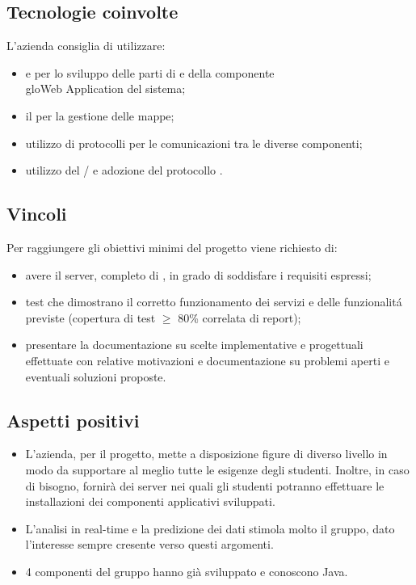 \subsection{Tecnologie coinvolte}
L'azienda consiglia di utilizzare:
\begin{itemize}
	\item {} e  per lo sviluppo delle parti di  e  della componente \\glo{Web Application} del sistema;
	\item il   per la gestione delle mappe;
	\item utilizzo di protocolli  per le comunicazioni tra le diverse componenti;
	\item utilizzo del  / e adozione del protocollo . 
\end{itemize}

\subsection{Vincoli}
Per raggiungere gli obiettivi minimi del progetto viene richiesto di:
\begin{itemize}
	\item avere il server, completo di , in grado di soddisfare i requisiti espressi;
	\item test che dimostrano il corretto funzionamento dei servizi e delle funzionalit\'a previste (copertura di test $\geq$ 80\% correlata di report);
	\item presentare la documentazione su scelte implementative e progettuali effettuate con relative motivazioni e documentazione su problemi aperti e eventuali soluzioni proposte.
\end{itemize}

\subsection{Aspetti positivi}
\begin{itemize}
	\item L'azienda, per il progetto, mette a disposizione figure di diverso livello in modo da supportare al meglio tutte le esigenze degli studenti. Inoltre, in caso di bisogno, fornirà dei server nei quali gli studenti potranno effettuare le installazioni dei componenti applicativi sviluppati.
	\item L'analisi in real-time e la predizione dei dati stimola molto il gruppo, dato l'interesse sempre cresente verso questi argomenti. 
	\item 4 componenti del gruppo hanno già sviluppato e conoscono Java.
\end{itemize}

